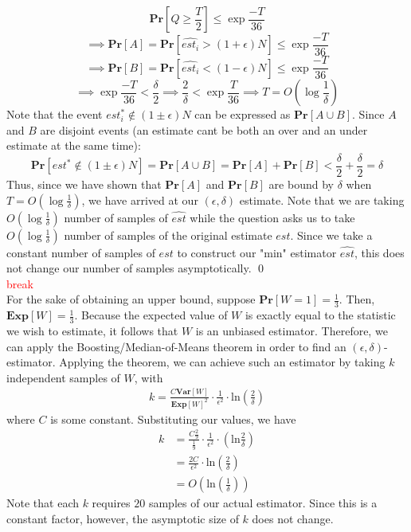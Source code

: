 \documentclass[12pt]{article}
\begin{document}
\begin{solution}
\[
\textbf{Pr}[Q \geq \frac{T}{2}] \leq \exp{\frac{-T}{36}}
\]
\[
\implies \textbf{Pr}[A] = \textbf{Pr}[\hat{est_i} > (1 + \epsilon) N] \leq \exp{\frac{-T}{36}}
\]
\[
\implies \textbf{Pr}[B] =\textbf{Pr}[\hat{est_i} < (1 - \epsilon) N] \leq \exp{\frac{-T}{36}}
\]
\[
\implies \exp{\frac{-T}{36}} < \frac{\delta}{2} \implies \frac{2}{\delta} < \exp{\frac{T}{36}} \implies T = O(\log{\frac{1}{\delta}})
\]
Note that the event $est_i^* \notin (1 \pm \epsilon) N$ can be expressed as $\textbf{Pr}[A\cup B]$. Since $A$ and $B$ are disjoint events (an estimate cant be both an over and an under estimate at the same time):
\[
\textbf{Pr}[est^* \notin (1 \pm \epsilon) N] = \textbf{Pr}[A\cup B] = \textbf{Pr}[A] + \textbf{Pr}[B] < \frac{\delta}{2} +\frac{\delta}{2} = \delta
\]
Thus, since we have shown that $\textbf{Pr}[A]$ and $\textbf{Pr}[B]$ are bound by $\delta$ when $T = O(\log{\frac{1}{\delta}})$, we have arrived at our $(\epsilon,\delta)$ estimate. Note that we are taking $O(\log{\frac{1}{\delta}})$ number of samples of $\hat{est}$ while the question asks us to take $O(\log{\frac{1}{\delta}})$ number of samples of the original estimate $est$. Since we take a constant number of samples of $est$ to construct our "min" estimator $\hat{est}$, this does not change our number of samples asymptotically. \qed
\\
\vspace{5pt}
\textcolor{red}{break}
\\For the sake of obtaining an upper bound, suppose $\textbf{Pr}[W = 1] = \frac{1}{3}$. Then, $\textbf{Exp}[W] = \frac{1}{3}$. Because the expected value of $W$ is exactly equal to the statistic we wish to estimate, it follows that $W$ is an unbiased estimator. Therefore, we can apply the Boosting/Median-of-Means theorem in order to find an $(\epsilon, \delta)$-estimator. Applying the theorem, we can achieve such an estimator by taking $k$ independent samples of $W$, with
\begin{align*}
    k = \frac{C\textbf{Var}[W]}{\textbf{Exp}[W]^2} \cdot \frac{1}{\epsilon^2} \cdot \text{ln}\left(\frac{2}{\delta}\right)
\end{align*}
where $C$ is some constant. Substituting our values, we have
\begin{align*}
    k &= \frac{C\frac{2}{9}}{\frac{1}{9}} \cdot \frac{1}{\epsilon^2} \cdot \left(\text{ln}\frac{2}{\delta}\right) \\
    &= \frac{2C}{\epsilon^2} \cdot \text{ln}\left(\frac{2}{\delta}\right) \\
    &= O\left(\text{ln}\left(\frac{1}{\delta}\right)\right)
\end{align*}
Note that each $k$ requires $20$ samples of our actual estimator. Since this is a constant factor, however, the asymptotic size of $k$ does not change.  \\



\end{solution}
\end{document}
